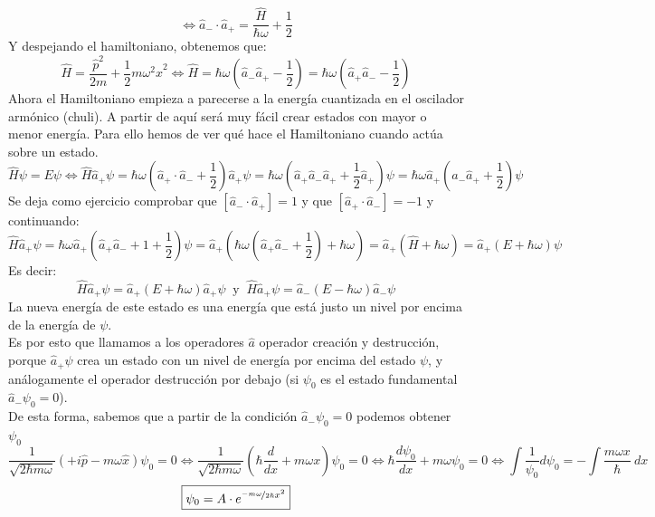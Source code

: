 \documentclass{report}
\begin{document}
    \[\Longleftrightarrow \hat{a}_-\cdot\hat{a}_+=\dfrac{\hat{H}}{\hbar\omega}+\dfrac{1}{2}\]
    Y despejando el hamiltoniano, obtenemos que:
    \begin{equation}
      \hat{H}=\dfrac{\hat{p}^2}{2m}+\dfrac12 m\omega^2\hat{x}^2\Longleftrightarrow\boxed{\hat{H}=\hbar\omega\left(\hat{a}_-\hat{a}_+-\dfrac12\right)=\hbar\omega\left(\hat{a}_+\hat{a}_--\dfrac12\right)}
    \end{equation}
    \clearpage
    \noindent Ahora el Hamiltoniano empieza a parecerse a la energía cuantizada en el oscilador armónico (chuli). A partir de aquí será muy fácil crear estados con mayor o menor energía. Para ello hemos de ver qué hace el Hamiltoniano cuando actúa sobre un estado.
    \[\hat{H}\psi=E\psi\Longleftrightarrow \hat{H}\hat{a}_+\psi=\hbar\omega\left(\hat{a}_+\cdot\hat{a}_-+\dfrac12\right)\hat{a}_+\psi=
    \hbar\omega\left(\hat{a}_+\hat{a}_-\hat{a}_+ +\dfrac12\hat{a}_+\right)\psi=\hbar\omega\hat{a}_+\left(\hat{a}_-\hat{a}_++\dfrac12\right)\psi
    \]
    \noindent Se deja como ejercicio comprobar que $\left[\hat{a}_-\cdot\hat{a}_+\right]=1$ y que $\left[\hat{a}_+\cdot\hat{a}_-\right]=-1$ y continuando:
    \[\hat{H}\hat{a}_+\psi=\hbar\omega\hat{a}_+\left(\hat{a}_+\hat{a}_-+1+\dfrac12\right)\psi=\hat{a}_+\left(\hbar\omega\left(\hat{a}_+\hat{a}_-+\dfrac12\right)+\hbar\omega\right)=
    \hat{a}_+\left(\hat{H}+\hbar\omega\right)=\hat{a}_+\left(E+\hbar\omega\right)\psi\]
    Es decir:
    \begin{equation}
      \boxed{\hat{H}\hat{a}_+\psi=\hat{a}_+\left(E+\hbar\omega\right)\hat{a}_+\psi}\ \text{ y }\ \boxed{\hat{H}\hat{a}_+\psi=\hat{a}_-\left(E-\hbar\omega\right)\hat{a}_-\psi}
    \end{equation}
    \noindent La nueva energía de este estado es una energía que está justo un nivel por encima de la energía de $\psi$. \\

    \noindent Es por esto que llamamos a los operadores $\hat{a}$ operador creación y destrucción, porque
    $\hat{a}_+\psi$ crea un estado con un nivel de energía por encima del estado $\psi$, y análogamente 
    el operador destrucción por debajo (si $\psi_0$ es el estado fundamental $\hat{a}_-\psi_0=0$).\\

    \noindent De esta forma, sabemos que a partir de la condición $\hat{a}_-\psi_0=0$ podemos obtener $\psi_0$
    \[\dfrac{1}{\sqrt{2\hbar m\omega}}\left(+i\hat{p}-m\omega\hat{x}\right)\psi_0=0 \Longleftrightarrow \dfrac{1}{\sqrt{2\hbar m\omega}}\left(\hbar\dfrac{d}{dx}+m\omega x\right)\psi_0=0
    \Longleftrightarrow \hbar\dfrac{d\psi_0}{dx}+m\omega\psi_0=0\Longleftrightarrow 
    \int\dfrac{1}{\psi_0}d\psi_0=-\int\dfrac{m\omega x}{\hbar}\ dx\]
    \[\boxed{\psi_0=A\cdot e^{\nicefrac{-m\omega}{2\hbar}x^2}}\]
\end{document}
